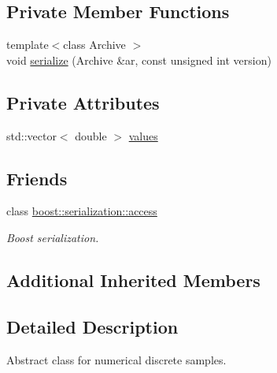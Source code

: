 \subsection*{Private Member Functions}
\begin{DoxyCompactItemize}
\item 
{\footnotesize template$<$class Archive $>$ }\\void \hyperlink{class_c_numerical_sample_a1f1ace88ad7ae05196dcd498b518af3c}{serialize} (Archive \&ar, const unsigned int version)
\end{DoxyCompactItemize}
\subsection*{Private Attributes}
\begin{DoxyCompactItemize}
\item 
std\-::vector$<$ double $>$ \hyperlink{class_c_numerical_sample_a2e2653a81d6c91eafc0548c0e7b50227}{values}
\end{DoxyCompactItemize}
\subsection*{Friends}
\begin{DoxyCompactItemize}
\item 
class \hyperlink{class_c_numerical_sample_ac98d07dd8f7b70e16ccb9a01abf56b9c}{boost\-::serialization\-::access}
\begin{DoxyCompactList}\small\item\em Boost serialization. \end{DoxyCompactList}\end{DoxyCompactItemize}
\subsection*{Additional Inherited Members}


\subsection{Detailed Description}
Abstract class for numerical discrete samples. 

